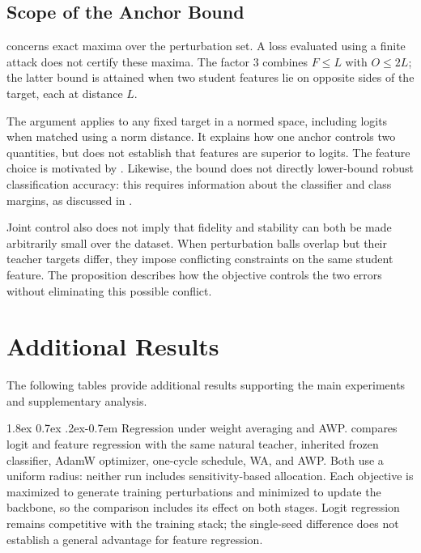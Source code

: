 \documentclass{article} %
\makeatletter
\theoremstyle{plain}
\renewcommand{\paragraph}{\@startsection{paragraph}{4}{\z@}%
  {1.8ex \@plus 0.7ex \@minus .2ex}{-0.7em}%
  {\normalfont\normalsize\bfseries}}
\makeatother
\begin{document}
\FloatBarrier
\subsection{Scope of the Anchor Bound}
\label{app:anchor_scope}

 concerns exact maxima over the perturbation set. A loss evaluated using a finite
attack does not certify these maxima. The factor $3$ combines $F\le L$ with $O\le2L$; the latter
bound is attained when two student features lie on opposite sides of the target, each at distance $L$.

The argument applies to any fixed target in a normed space, including logits when matched using a
norm distance. It explains how one anchor controls two quantities, but does not establish that
features are superior to logits. The feature choice is motivated by . Likewise,
the bound does not directly lower-bound robust classification accuracy: this requires information
about the classifier and class margins, as discussed in .

Joint control also does not imply that fidelity and stability can both be made arbitrarily small
over the dataset. When perturbation balls overlap but their teacher targets differ, they impose
conflicting constraints on the same student feature. The proposition describes how the objective
controls the two errors without eliminating this possible conflict.

\section{Additional Results}
\label{app:more}

The following tables provide additional results supporting the main experiments and supplementary
analysis.

\paragraph{Regression under weight averaging and AWP.}
 compares logit and feature regression with the same natural teacher,
inherited frozen classifier, AdamW optimizer, one-cycle schedule, WA, and AWP. Both use a uniform
radius: neither run includes sensitivity-based allocation. Each objective is maximized to generate
training perturbations and minimized to update the backbone, so the comparison includes its effect
on both stages. Logit regression remains competitive with the training stack; the single-seed
difference does not establish a general advantage for feature regression.
\end{document}

